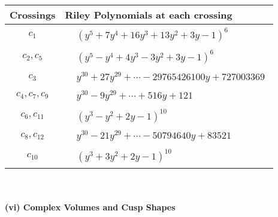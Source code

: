 \documentclass[1p]{elsarticle_modified}
\theoremstyle{definition}
\begin{document}
\begin{tabular}{m{50pt}|m{274pt}}
Crossings & \hspace{64pt}Riley Polynomials at each crossing \\
\hline $$\begin{aligned}c_{1}\end{aligned}$$&$\begin{aligned}
&(y^5+7 y^4+16 y^3+13 y^2+3 y-1)^6
\end{aligned}$\\
\hline $$\begin{aligned}c_{2},c_{5}\end{aligned}$$&$\begin{aligned}
&(y^5- y^4+4 y^3-3 y^2+3 y-1)^6
\end{aligned}$\\
\hline $$\begin{aligned}c_{3}\end{aligned}$$&$\begin{aligned}
&y^{30}+27 y^{29}+\cdots-29765426100 y+727003369
\end{aligned}$\\
\hline $$\begin{aligned}c_{4},c_{7},c_{9}\end{aligned}$$&$\begin{aligned}
&y^{30}-9 y^{29}+\cdots+516 y+121
\end{aligned}$\\
\hline $$\begin{aligned}c_{6},c_{11}\end{aligned}$$&$\begin{aligned}
&(y^3- y^2+2 y-1)^{10}
\end{aligned}$\\
\hline $$\begin{aligned}c_{8},c_{12}\end{aligned}$$&$\begin{aligned}
&y^{30}-21 y^{29}+\cdots-50794640 y+83521
\end{aligned}$\\
\hline $$\begin{aligned}c_{10}\end{aligned}$$&$\begin{aligned}
&(y^3+3 y^2+2 y-1)^{10}
\end{aligned}$\\
\hline
\end{tabular}\\~\\
\newpage\flushleft \textbf{(vi) Complex Volumes and Cusp Shapes}
\end{document}
